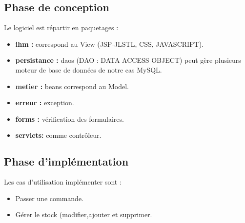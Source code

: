 \documentclass[french,10pt,a4paper]{report}
\begin{document}
\subsection{\textcolor{bb}{Phase de conception}}
Le logiciel est répartir en paquetages :
\begin{itemize}
\item \textbf{ihm :} correspond au View (JSP-JLSTL, CSS, JAVASCRIPT).
\item \textbf{persistance :} daos (DAO : DATA ACCESS OBJECT) peut gère plusieurs moteur de base de données de notre cas MySQL.
\item \textbf{metier :}  beans correspond au Model.
\item \textbf{erreur :} exception.
\item \textbf{forms :} vérification des formulaires.
\item \textbf{servlets:} comme contrôleur.
\end{itemize}
\subsection{\textcolor{bb}{Phase d'implémentation}}
Les cas d'utilisation implémenter sont :
\begin{itemize}
\item Passer une commande. 
\item Gérer le stock (modifier,ajouter et supprimer.
\end{itemize}
\end{document}
